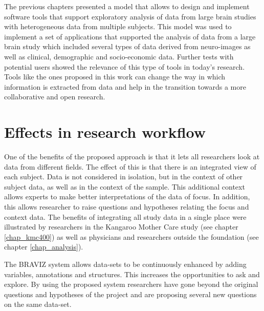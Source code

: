 The previous chapters presented a model that allows to design and implement software tools that support exploratory analysis of data from large brain studies with heterogeneous data from multiple subjects. This model was used to implement a set of applications that supported the analysis of data from a large brain study which included several types of data derived from neuro-images as well as clinical, demographic and socio-economic data. Further tests with potential users showed the relevance of this type of tools in today's research. Tools like the ones proposed in this work can change the way in which information is extracted from data and help in the transition towards a more collaborative and open research. 

\section{Effects in research workflow}



One of the benefits of the proposed approach is that it lets all researchers look at data from different fields. The effect of this is that there is an integrated view of each subject. Data is not considered in isolation, but in the context of other subject data, as well as in the context of the sample. This additional context allows experts to make better interpretations of the data of focus. In addition, this allows researcher to raise questions and hypotheses relating the focus and context data. The benefits of integrating all study data in a single place were illustrated by researchers in the Kangaroo Mother Care study (see chapter \ref{chap_kmc400}) as well as physicians and researchers outside the foundation (see chapter \ref{chap_analysis}).


The BRAVIZ system allows data-sets to be continuously enhanced by adding variables, annotations and structures. This increases the opportunities to ask and explore.  By using the proposed system researchers have gone beyond the original questions and hypotheses of the project and are proposing several new questions on the same data-set. 

